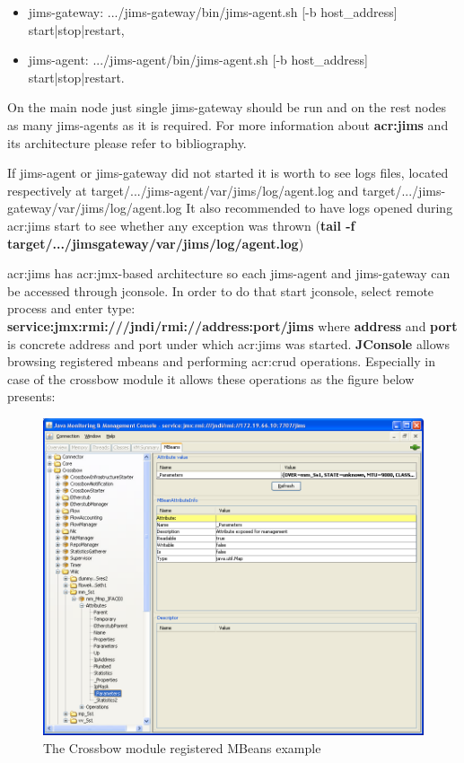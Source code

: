 \documentclass[11pt]{book}
\begin{document}
      \begin{itemize}
        \item jims-gateway: .../jims-gateway/bin/jims-agent.sh [-b host\_address] start|stop|restart,
        \item jims-agent: .../jims-agent/bin/jims-agent.sh [-b host\_address] start|stop|restart.
      \end{itemize}

      On the main node just single jims-gateway should be run and on the rest nodes as many jims-agents as it is required. For more
      information about \textbf{\gls{acr:jims}} and its architecture please refer to bibliography.

      If jims-agent or jims-gateway did not started it is worth to see logs files, located respectively at
      target/.../jims-agent/var/jims/log/agent.log and target/.../jims-gateway/var/jims/log/agent.log
      It also recommended to have logs opened during \gls{acr:jims} start to see whether any exception was thrown (\textbf{tail
      -f target/.../jims\-gateway/var/jims/log/agent.log})

      \gls{acr:jims} has \gls{acr:jmx}-based architecture so each jims-agent and jims-gateway can be accessed through
      jconsole. In order to do that start jconsole, select remote process and enter type: \\
      \textbf{service:jmx:rmi:///jndi/rmi://address:port/jims} where \textbf{address} and \textbf{port} is concrete
      address and port under which \gls{acr:jims} was started. \textbf{JConsole} allows browsing registered mbeans and
      performing \gls{acr:crud} operations. Especially in case of the crossbow module it allows these operations as the
      figure below presents:

	  \begin{figure}[H]
        \begin{center}
            \includegraphics[width=1.0\textwidth]{img/impl/jconsole.png}
        \end{center}
        \caption{The Crossbow module registered MBeans example}
      \end{figure}
	  
\end{document}
